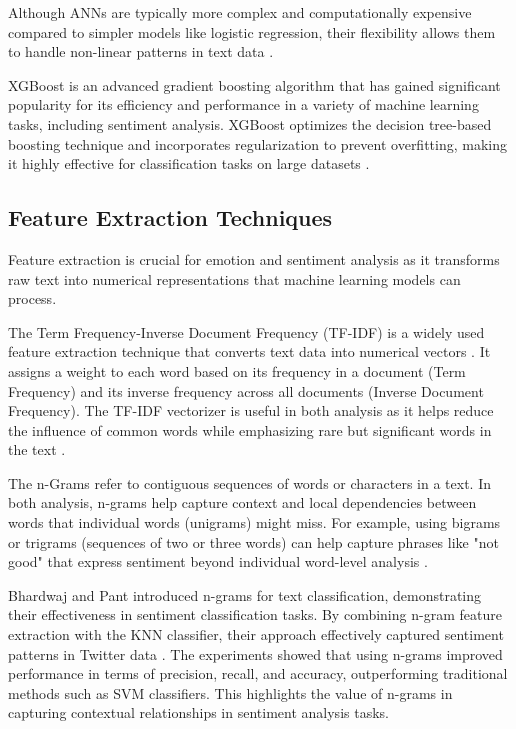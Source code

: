 Although ANNs are typically more complex and computationally expensive compared to simpler models like logistic regression, their flexibility allows them to handle non-linear patterns in text data \cite{Collobert2011}.

XGBoost is an advanced gradient boosting algorithm that has gained significant popularity for its efficiency and performance in a variety of machine learning tasks, including sentiment analysis. XGBoost optimizes the decision tree-based boosting technique and incorporates regularization to prevent overfitting, making it highly effective for classification tasks on large datasets \cite{Bentejac2019}.

\subsection{Feature Extraction Techniques}

Feature extraction is crucial for emotion and sentiment analysis as it transforms raw text into numerical representations that machine learning models can process.

The Term Frequency-Inverse Document Frequency (TF-IDF) is a widely used feature extraction technique that converts text data into numerical vectors \cite{Semary2024}. It assigns a weight to each word based on its frequency in a document (Term Frequency) and its inverse frequency across all documents (Inverse Document Frequency). The TF-IDF vectorizer is useful in both analysis as it helps reduce the influence of common words while emphasizing rare but significant words in the text \cite{Nguyen2014}.

The n-Grams refer to contiguous sequences of words or characters in a text. In both analysis, n-grams help capture context and local dependencies between words that individual words (unigrams) might miss. For example, using bigrams or trigrams (sequences of two or three words) can help capture phrases like "not good" that express sentiment beyond individual word-level analysis \cite{Ojo2021}.

Bhardwaj and Pant introduced n-grams for text classification, demonstrating their effectiveness in sentiment classification tasks. By combining n-gram feature extraction with the KNN classifier, their approach effectively captured sentiment patterns in Twitter data \cite{Bhardwaj2019}. The experiments showed that using n-grams improved performance in terms of precision, recall, and accuracy, outperforming traditional methods such as SVM classifiers. This highlights the value of n-grams in capturing contextual relationships in sentiment analysis tasks.

